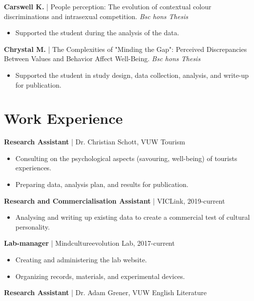\documentclass[11pt]{article} %
\begin{document}
\textbf{Carswell K.} | People perception: The evolution of contextual colour discriminations and intrasexual competition.  \emph{Bsc hons Thesis}
\begin{itemize}
\item Supported the student during the analysis of the data.
\end{itemize}

\textbf{Chrystal M.} | The Complexities of "Minding the Gap": Perceived Discrepancies Between Values and Behavior Affect Well-Being. \emph{Bsc hons Thesis}
\begin{itemize}
\item Supported the student in study design, data collection, analysis, and write-up for publication. 

\end{itemize}



\section*{Work Experience}

\textbf{Research Assistant} | Dr. Christian Schott, VUW Tourism
\begin{itemize}
\item Consulting on the psychological aspects (savouring, well-being) of tourists experiences.
\item Preparing data, analysis plan, and results for publication.
\end{itemize}

\textbf{Research and Commercialisation Assistant} | VICLink, 2019-current 


\begin{itemize}
\item Analysing and writing up existing data to create a commercial test of cultural personality.
\end{itemize}

\textbf{Lab-manager} | Mindcultureevolution Lab, 2017-current
\begin{itemize}
\item Creating and administering the lab website.
\item Organizing records, materials, and experimental devices.

\end{itemize}


\textbf{Research Assistant} | Dr. Adam Grener, VUW English Literature
\end{document}
